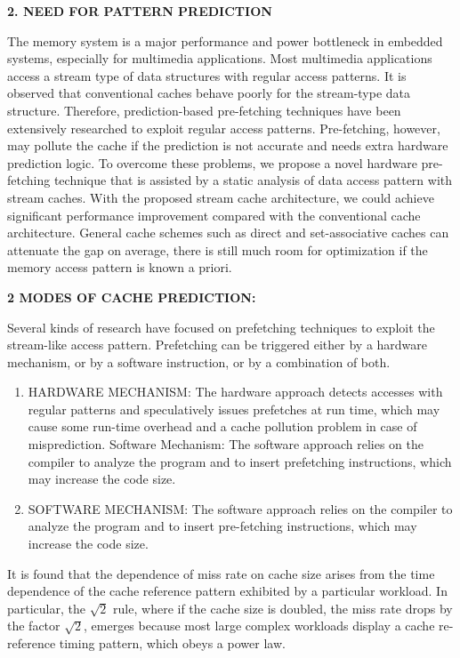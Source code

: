 \documentclass[14pt]{article}
\begin{document}
\vspace{3ex}
\newpage
\begin{center}
\textbf{2. NEED FOR PATTERN PREDICTION}
\end{center}
The memory system is a major performance and power bottleneck in embedded systems, especially for multimedia applications. Most multimedia applications access a stream type of data structures with regular access patterns. It is observed that conventional caches behave poorly for the stream-type data structure. Therefore, prediction-based pre-fetching techniques have been extensively researched to exploit regular access patterns. Pre-fetching, however, may pollute the cache if the prediction is not accurate and needs extra hardware prediction logic. To overcome these problems, we propose a novel hardware pre-fetching technique that is assisted by a static analysis of data access pattern with stream caches. With the proposed stream cache architecture, we could achieve significant performance improvement compared with the conventional cache architecture. General cache schemes such as direct and set-associative caches can attenuate the gap on average, there is still much room for optimization if the memory access pattern is known a priori. 
\\
\begin{center}
\textbf{2 MODES OF CACHE PREDICTION:}
\end{center}
Several kinds of research have focused on prefetching techniques to exploit the stream-like access pattern. Prefetching can be triggered either by a hardware mechanism, or by a software instruction, or by a combination of both.
\begin{enumerate}
  \item HARDWARE MECHANISM:
  The hardware approach detects accesses with regular patterns and speculatively issues prefetches at run time, which may cause some run-time overhead and a cache pollution problem in case of misprediction. 
Software Mechanism: The software approach relies on the compiler to analyze the program and to insert prefetching instructions, which may increase the code size. 
	\item SOFTWARE MECHANISM: 
	The software approach relies on the compiler to analyze the program and to insert pre-fetching instructions, which may increase the code size. \\
\end{enumerate}

It is found that the dependence of miss rate on cache size arises from the time dependence of the cache reference pattern exhibited by a particular workload. In particular, the $\sqrt{2}$ rule, where if the cache size is doubled, the miss rate drops by the factor $\sqrt{2}$, emerges because most large complex workloads display a cache re-reference timing pattern, which obeys a power law. 
\end{document}
